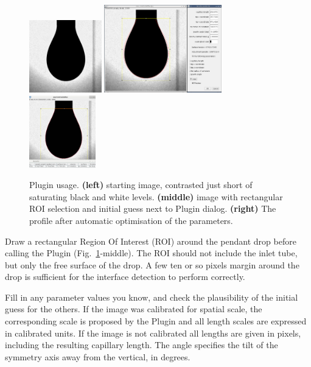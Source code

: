 \documentclass[fleqn]{scrartcl}
\begin{document}
\begin{figure}
  \centering
  \includegraphics[width=0.28\textwidth]{eauContrasteMax}\hfill
  \includegraphics[width=0.455\textwidth]{eauContrasteMaxInitial}\hfill
  \includegraphics[width=0.258\textwidth]{eauContrasteMaxFit}
  \caption{Plugin usage. \textbf{(left)} starting image, contrasted
    just short of saturating black and white levels. \textbf{(middle)}
    image with rectangular ROI selection and initial guess next to
    Plugin dialog. \textbf{(right)} The profile after automatic
    optimisation of the parameters.}
  \label{fig:usage}
\end{figure}

Draw a rectangular Region Of Interest (ROI) around the pendant drop
before calling the Plugin (Fig.~\ref{fig:usage}-middle). The ROI
should not include the inlet tube, but only the free surface of the
drop. A few ten or so pixels margin around the drop is sufficient for
the interface detection to perform correctly.

Fill in any parameter values you know, and check the plausibility of
the initial guess for the others. If the image was calibrated for
spatial scale, the corresponding scale is proposed by the Plugin and
all length scales are expressed in calibrated units. If the image is
not calibrated all lengths are given in pixels, including the
resulting capillary length. The angle specifies the tilt of the
symmetry axis away from the vertical, in degrees. 
\end{document}
